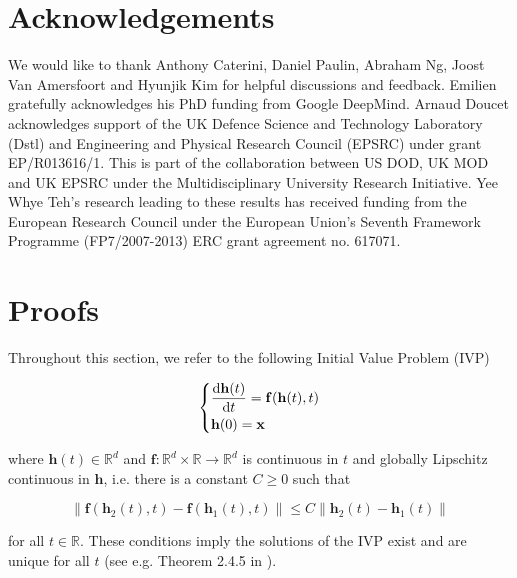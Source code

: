 \documentclass{article}
\begin{document}
\section*{Acknowledgements}
We would like to thank Anthony Caterini, Daniel Paulin, Abraham Ng, Joost Van Amersfoort and Hyunjik Kim for helpful discussions and feedback. Emilien gratefully acknowledges his PhD funding from Google DeepMind. Arnaud Doucet acknowledges support of the UK Defence Science and Technology Laboratory (Dstl) and Engineering and Physical Research Council (EPSRC) under grant EP/R013616/1.  This is part of the collaboration between US DOD, UK MOD and UK EPSRC under the Multidisciplinary University Research Initiative. Yee Whye Teh's research leading to these results has received funding from the European Research Council under the European Union's Seventh Framework Programme (FP7/2007-2013) ERC grant agreement no. 617071.




\vfill
\pagebreak









\appendix

\section{Proofs}

Throughout this section, we refer to the following Initial Value Problem (IVP)

\begin{equation} \label{ivp-def}
  \begin{dcases}
       \frac{\mathrm{d}\mathbf{h}(t)}{\mathrm{d}t} = \mathbf{f}(\mathbf{h}(t), t) \\
       \mathbf{h}(0) = \mathbf{x}
  \end{dcases}
\end{equation}

where $\mathbf{h}(t) \in \mathbb{R}^d$ and $\mathbf{f} : \mathbb{R}^d \times \mathbb{R} \to \mathbb{R}^d$ is continuous in $t$ and globally Lipschitz continuous in $\mathbf{h}$, i.e. there is a constant $C \geq 0$ such that

$$\|\mathbf{f}(\mathbf{h}_2(t), t) - \mathbf{f}(\mathbf{h}_1(t), t)\| \leq C \|\mathbf{h}_2(t) - \mathbf{h}_1(t)\|$$

for all $t \in \mathbb{R}$. These conditions imply the solutions of the IVP exist and are unique for all $t$ (see e.g. Theorem 2.4.5 in \cite{ahmad2015textbook}).
\end{document}
